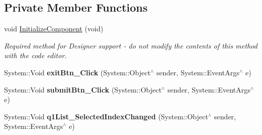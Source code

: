\subsection*{Private Member Functions}
\begin{DoxyCompactItemize}
\item 
void \mbox{\hyperlink{class_gaze_track_g_u_i_1_1_feedback_a31c61a04fb35ae92344f9fa7e609aef4}{Initialize\+Component}} (void)
\begin{DoxyCompactList}\small\item\em Required method for Designer support -\/ do not modify the contents of this method with the code editor. \end{DoxyCompactList}\item 
\mbox{\label{class_gaze_track_g_u_i_1_1_feedback_ac3924a149f409502ff26393084bf7c59}} 
System\+::\+Void {\bfseries exit\+Btn\+\_\+\+Click} (System\+::\+Object$^\wedge$ sender, System\+::\+Event\+Args$^\wedge$ e)
\item 
\mbox{\label{class_gaze_track_g_u_i_1_1_feedback_a1ec056911bbf5543910b61ea024f0b92}} 
System\+::\+Void {\bfseries submit\+Btn\+\_\+\+Click} (System\+::\+Object$^\wedge$ sender, System\+::\+Event\+Args$^\wedge$ e)
\item 
\mbox{\label{class_gaze_track_g_u_i_1_1_feedback_a3d6590b575892e4f512ad4ad172a63c6}} 
System\+::\+Void {\bfseries q1\+List\+\_\+\+Selected\+Index\+Changed} (System\+::\+Object$^\wedge$ sender, System\+::\+Event\+Args$^\wedge$ e)
\end{DoxyCompactItemize}
